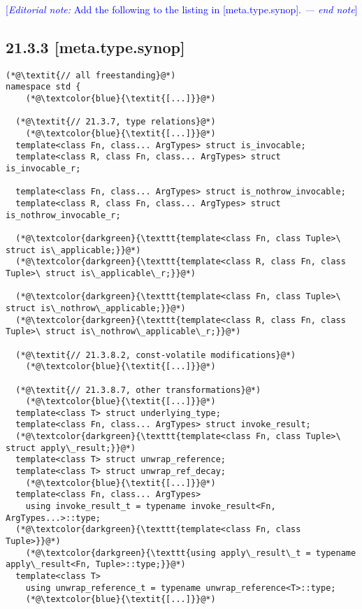 \documentclass{article}
\begin{document}
\textcolor{blue}{[\textit{Editorial note:} Add the following to the listing in [meta.type.synop]. \textit{--- end note}]}

\subsection*{21.3.3 [meta.type.synop]}
\begin{lstlisting}[style=base]
(*@\textit{// all freestanding}@*)
namespace std {
    (*@\textcolor{blue}{\textit{[...]}}@*)

  (*@\textit{// 21.3.7, type relations}@*)
    (*@\textcolor{blue}{\textit{[...]}}@*)
  template<class Fn, class... ArgTypes> struct is_invocable;
  template<class R, class Fn, class... ArgTypes> struct is_invocable_r;

  template<class Fn, class... ArgTypes> struct is_nothrow_invocable;
  template<class R, class Fn, class... ArgTypes> struct is_nothrow_invocable_r;

  (*@\textcolor{darkgreen}{\texttt{template<class Fn, class Tuple>\ struct is\_applicable;}}@*)
  (*@\textcolor{darkgreen}{\texttt{template<class R, class Fn, class Tuple>\ struct is\_applicable\_r;}}@*)

  (*@\textcolor{darkgreen}{\texttt{template<class Fn, class Tuple>\ struct is\_nothrow\_applicable;}}@*)
  (*@\textcolor{darkgreen}{\texttt{template<class R, class Fn, class Tuple>\ struct is\_nothrow\_applicable\_r;}}@*)
  
  (*@\textit{// 21.3.8.2, const-volatile modifications}@*)
    (*@\textcolor{blue}{\textit{[...]}}@*)

  (*@\textit{// 21.3.8.7, other transformations}@*)
    (*@\textcolor{blue}{\textit{[...]}}@*)
  template<class T> struct underlying_type;
  template<class Fn, class... ArgTypes> struct invoke_result;
  (*@\textcolor{darkgreen}{\texttt{template<class Fn, class Tuple>\ struct apply\_result;}}@*)
  template<class T> struct unwrap_reference;
  template<class T> struct unwrap_ref_decay;
    (*@\textcolor{blue}{\textit{[...]}}@*)
  template<class Fn, class... ArgTypes>
    using invoke_result_t = typename invoke_result<Fn, ArgTypes...>::type;
  (*@\textcolor{darkgreen}{\texttt{template<class Fn, class Tuple>}}@*)
    (*@\textcolor{darkgreen}{\texttt{using apply\_result\_t = typename apply\_result<Fn, Tuple>::type;}}@*)
  template<class T>
    using unwrap_reference_t = typename unwrap_reference<T>::type;
    (*@\textcolor{blue}{\textit{[...]}}@*)


\end{lstlisting}
\end{document}
